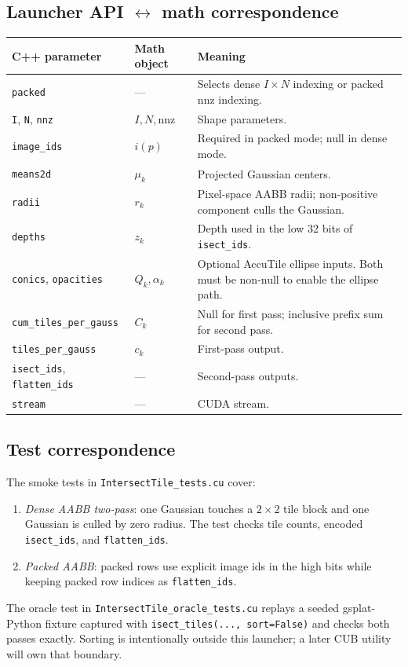 \documentclass[11pt]{article}
\begin{document}
\subsection{Launcher API \texorpdfstring{$\leftrightarrow$}{<->} math correspondence}

\begin{center}
\begin{tabular}{l l p{7.5cm}}
\hline
\textbf{C++ parameter} & \textbf{Math object} & \textbf{Meaning} \\
\hline
\texttt{packed} & --- & Selects dense $I\times N$ indexing or packed
$\mathrm{nnz}$ indexing. \\
\texttt{I}, \texttt{N}, \texttt{nnz} & $I,N,\mathrm{nnz}$ & Shape
parameters. \\
\texttt{image\_ids} & $i(p)$ & Required in packed mode; null in dense mode. \\
\texttt{means2d} & $\mu_k$ & Projected Gaussian centers. \\
\texttt{radii} & $r_k$ & Pixel-space AABB radii; non-positive component
culls the Gaussian. \\
\texttt{depths} & $z_k$ & Depth used in the low 32 bits of
\texttt{isect\_ids}. \\
\texttt{conics}, \texttt{opacities} & $Q_k,\alpha_k$ & Optional AccuTile
ellipse inputs. Both must be non-null to enable the ellipse path. \\
\texttt{cum\_tiles\_per\_gauss} & $C_k$ & Null for first pass; inclusive
prefix sum for second pass. \\
\texttt{tiles\_per\_gauss} & $c_k$ & First-pass output. \\
\texttt{isect\_ids}, \texttt{flatten\_ids} & --- & Second-pass outputs. \\
\texttt{stream} & --- & CUDA stream. \\
\hline
\end{tabular}
\end{center}

\subsection{Test correspondence}

The smoke tests in \texttt{IntersectTile\_tests.cu} cover:
\begin{enumerate}
  \item \emph{Dense AABB two-pass}: one Gaussian touches a $2\times2$
  tile block and one Gaussian is culled by zero radius. The test checks
  tile counts, encoded \texttt{isect\_ids}, and \texttt{flatten\_ids}.
  \item \emph{Packed AABB}: packed rows use explicit image ids in the
  high bits while keeping packed row indices as \texttt{flatten\_ids}.
\end{enumerate}
The oracle test in \texttt{IntersectTile\_oracle\_tests.cu} replays a
seeded gsplat-Python fixture captured with \texttt{isect\_tiles(...,
sort=False)} and checks both passes exactly. Sorting is intentionally
outside this launcher; a later CUB utility will own that boundary.
\end{document}
